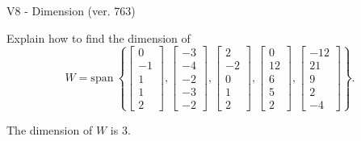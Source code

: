 \begin{exercise}
  \begin{exerciseTitle}V8 - Dimension (ver. 763)\end{exerciseTitle}
  \begin{exerciseStatement}
    Explain how to find the dimension of 
\[W=\mathrm{span}\ \left\{\left[\begin{array}{r}
0 \\
-1 \\
1 \\
1 \\
2
\end{array}\right] , \left[\begin{array}{r}
-3 \\
-4 \\
-2 \\
-3 \\
-2
\end{array}\right] , \left[\begin{array}{r}
2 \\
-2 \\
0 \\
1 \\
2
\end{array}\right] , \left[\begin{array}{r}
0 \\
12 \\
6 \\
5 \\
2
\end{array}\right] , \left[\begin{array}{r}
-12 \\
21 \\
9 \\
2 \\
-4
\end{array}\right]\right\}.\]



  \end{exerciseStatement}
  \begin{exerciseAnswer}
   The dimension of \(W\) is  \(3\).
  


  \end{exerciseAnswer}
\end{exercise}